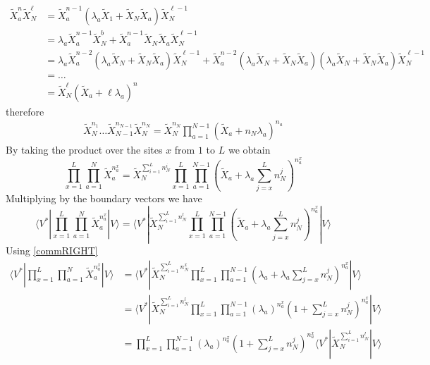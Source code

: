 \documentclass[10pt]{article}
\numberwithin{equation}{section}
\numberwithin{equation}{subsection}
\begin{document}
\begin{align*}
	\widetilde{X}_{a}^{n}\widetilde{X}_{N}^{\ell}&=\widetilde{X}_{a}^{n-1}\left(\lambda_{a}\widetilde{X}_{1}+\widetilde{X}_{N}\widetilde{X}_{a}\right)\widetilde{X}_{N}^{\ell-1}
	\\&=\lambda_{a}\widetilde{X}_{a}^{n-1}\widetilde{X}_{N}^{b}+\widetilde{X}_{a}^{n-1}\widetilde{X}_{N}\widetilde{X}_{a}\widetilde{X}_{N}^{\ell-1}
	\\&=
	\lambda_{a}\widetilde{X}_{a}^{n-2}\left(\lambda_{a}\widetilde{X}_{N}+\widetilde{X}_{N}\widetilde{X}_{a}\right)\widetilde{X}_{N}^{\ell-1}+\widetilde{X}_{a}^{n-2}\left(\lambda_{a}\widetilde{X}_{N}+\widetilde{X}_{N}\widetilde{X}_{a}\right)\left(\lambda_{a}\widetilde{X}_{N}+\widetilde{X}_{N}\widetilde{X}_{a}\right)\widetilde{X}_{N}^{\ell -1}
	\\&=\ldots\\&=
	\widetilde{X}_{N}^{\ell}\left(\widetilde{X}_{a}+\ell\lambda_{a}\right)^{n}
\end{align*}
therefore 
\begin{align*}
	\widetilde{X}_{N}^{n_{1}}\ldots\widetilde{X}_{N-1}^{n_{N-1}}\widetilde{X}_{N}^{n_{N}}=\widetilde{X}_{N}^{n_{N}}\prod_{a=1}^{N-1}\left(\widetilde{X}_{a}+n_{N}\lambda_{a}\right)^{n_{a}}
\end{align*}
By taking the product over the sites $x$ from $1$ to $L$ we obtain 
\begin{equation}
	\prod_{x=1}^{L}\prod_{a=1}^{N}\widetilde{X}_{a}^{n_{a}^{x}}=\widetilde{X}_{N}^{\sum_{i=1}^{L}n_{N}^{i}}\prod_{x=1}^{L}\prod_{a=1}^{N-1}\left(\widetilde{X}_{a}+\lambda_{a}\sum_{j=x}^{L}n_{N}^{j}\right)^{n_{a}^{x}}
\end{equation}
Multiplying by the boundary vectors we have 
\begin{equation}
	\langle V^{*}|\prod_{x=1}^{L}\prod_{a=1}^{N}\widetilde{X}_{a}^{n_{a}^{x}}
	|V \rangle=\langle V^{*}|\widetilde{X}_{N}^{\sum_{i=1}^{L}n_{N}^{l}}\prod_{x=1}^{L}\prod_{a=1}^{N-1}\left(\widetilde{X}_{a}+\lambda_{a}\sum_{j=x}^{L}n_{N}^{j}\right)^{n_{a}^{x}}|V\rangle
\end{equation}
Using \eqref{commRIGHT}
\begin{align*}
	\langle V^{*}|\prod_{x=1}^{L}\prod_{a=1}^{N}\widetilde{X}_{a}^{n_{a}^{x}}
	|V \rangle&=\langle V^{*}|\widetilde{X}_{N}^{\sum_{i=1}^{L}n_{N}^{x}}\prod_{x=1}^{L}\prod_{a=1}^{N-1}\left(\lambda_{a}+\lambda_{a}\sum_{j=x}^{L}n_{N}^{j}\right)^{n_{a}^{x}}|V\rangle
	\\&=
	\langle V^{*}|\widetilde{X}_{N}^{\sum_{i=1}^{L}n_{N}^{l}}\prod_{x=1}^{L}\prod_{a=1}^{N-1}\left(\lambda_{a}\right)^{n_{a}^{x}}\left(1+\sum_{j=x}^{L}n_{N}^{j}\right)^{n_{a}^{x}}|V\rangle
	\\&=
	\prod_{x=1}^{L}\prod_{a=1}^{N-1}\left(\lambda_{a}\right)^{n_{a}^{x}}\left(1+\sum_{j=x}^{L}n_{N}^{j}\right)^{n_{a}^{x}}\langle V^{*}|\widetilde{X}_{N}^{\sum_{i=1}^{L}n_{N}^{l}}|V\rangle
\end{align*}
\end{document}
